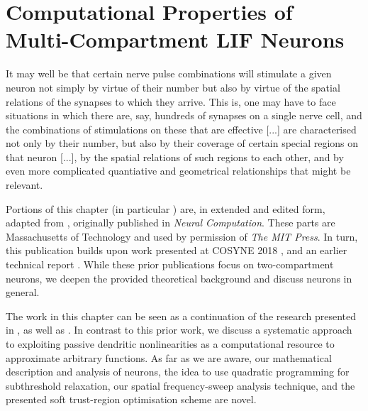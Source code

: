 \chapter{Computational Properties of Multi-Compartment LIF Neurons}
\label{chp:nlif}

\vspace{20pt}

\begin{OpeningQuote}
It may well be that certain nerve pulse combinations will stimulate a given neuron not simply by virtue of their number but also by virtue of the spatial relations of the synapses to which they arrive. This is, one may have to face situations in which there are, say, hundreds of synapses on a single nerve cell, and the combinations of stimulations on these that are effective [...] are characterised not only by their number, but also by their coverage of certain special regions on that neuron [...], by the spatial relations of such regions to each other, and by even more complicated quantiative and geometrical relationships that might be relevant.
\end{OpeningQuote}

\begin{PriorPublication}
Portions of this chapter (in particular ) are, in extended and edited form, adapted from \citet{stoeckel2021}, originally published in \emph{Neural Computation}. These parts are  Massachusetts of Technology and used by permission of \emph{The MIT Press}.
In turn, this publication builds upon work presented at COSYNE 2018 \citep{stockel2018nonlinear}, and an earlier technical report \citep{stockel2017point}.
While these prior publications focus on two-compartment \LIF neurons, we deepen the provided theoretical background and discuss \nlif neurons in general.
\end{PriorPublication}

\begin{Contributions}
The work in this chapter can be seen as a continuation of the research presented in \citet[Chapter~5]{koch1999biophysics}, as well as \citet[Chapter~4]{tripp2009search}.
In contrast to this prior work, we discuss a systematic approach to exploiting passive dendritic nonlinearities as a computational resource to approximate arbitrary functions.
As far as we are aware, our mathematical description and analysis of \nlif neurons, the idea to use quadratic programming for subthreshold relaxation, our spatial frequency-sweep analysis technique, and the presented soft trust-region optimisation scheme are novel.
\end{Contributions}

